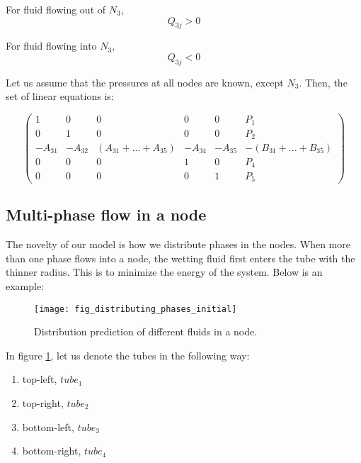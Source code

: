 	For fluid flowing out of $N_3$,
	\begin{equation}
		Q_{3j} > 0
	\end{equation}
	
	For fluid flowing into $N_3$,
	\begin{equation}
		Q_{3j} < 0
	\end{equation}
	
	Let us assume that the pressures at all nodes are known, except $N_3$. Then, the set of linear equations is:
	
	\begin{equation}
		\begin{pmatrix}
			1 & 0 & 0 & 0 & 0 & P_{1}\\
			0 & 1 & 0 & 0 & 0 & P_{2}\\
			-A_{31} & -A_{32} & (A_{31} + ... + A_{35}) & -A_{34} & -A_{35} & -(B_{31} + ... + B_{35})\\
			0 & 0 & 0 & 1 & 0 & P_{4}\\
			0 & 0 & 0 & 0 & 1 & P_{5}
		\end{pmatrix}
	\end{equation}
	
\subsection{Multi-phase flow in a node} \label{sec:multi-phase-flow}
	The novelty of our model is how we distribute phases in the nodes. When more than one phase flows into a node, the wetting fluid first enters the tube with the thinner radius. This is to minimize the energy of the system. Below is an example:
	
	\begin{figure}[H]
		\centering
		\texttt{[image: fig\_distributing\_phases\_initial]}
		\caption{Distribution prediction of different fluids in a node.}
		\label{fig:distributing_phases_initial}
	\end{figure}
	
	In figure \ref{fig:distributing_phases_initial}, let us denote the tubes in the following way:
		
	\begin{enumerate}
		\item top-left, ${tube}_1$
		\item top-right, ${tube}_2$
		\item bottom-left, ${tube}_3$
		\item bottom-right, ${tube}_4$
	\end{enumerate}
	
